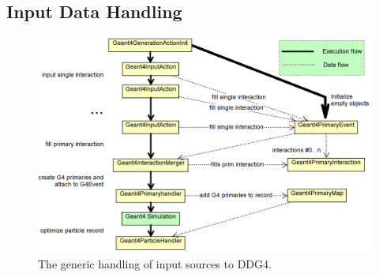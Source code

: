 \subsection{Input Data Handling}
\label{sec:ddg4-implementation-input-handling}
\begin{figure}[t]
  \begin{center}
    \includegraphics[width=160mm] {DDG4_input_stage.png}
    \caption{The generic handling of input sources to DDG4.}
    \label{fig:ddg4-input-stage}
  \end{center}
\end{figure}

